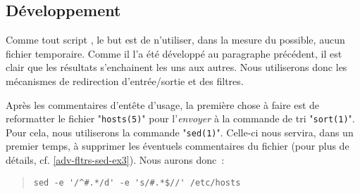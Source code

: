 \subsection{D{\'e}veloppement}

Comme tout script {\Unix}, le but est de n'utiliser, dans la mesure du possible,
aucun fichier temporaire. Comme il l'a {\'e}t{\'e} d{\'e}velopp{\'e} au paragraphe pr{\'e}c{\'e}dent,
il est clair que les r{\'e}sultats s'enchainent les uns aux autres. Nous utiliserons
donc les m{\'e}canismes de redirection d'entr{\'e}e/sortie et des filtres.

Apr{\`e}s les commentaires d'ent{\^e}te d'usage, la premi{\`e}re chose {\`a}
faire est de reformatter le fichier "{\tt hosts(5)}" pour
l'{\sl envoyer} {\`a} la commande de tri "{\tt sort(1)}". Pour cela, nous
utiliserons la commande "{\tt sed(1)}". Celle-ci nous servira, dans
un premier temps, {\`a} supprimer les {\'e}ventuels commentaires du fichier
(pour plus de d{\'e}tails, cf. \ref{adv-fltrs-sed-ex3}). Nous aurons donc~:
\begin{quote}
\begin{verbatim}
sed -e '/^#.*/d' -e 's/#.*$//' /etc/hosts
\end{verbatim}
\end{quote}

